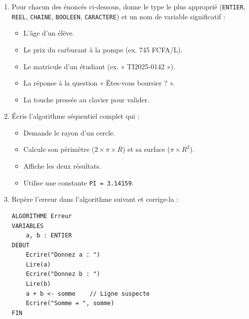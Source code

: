 \documentclass[11pt]{article}
\begin{document}
\begin{exercice}
\begin{enumerate}
    \item Pour chacun des énoncés ci-dessous, donne le type le plus approprié (\texttt{ENTIER}, \texttt{REEL}, \texttt{CHAINE}, \texttt{BOOLEEN}, \texttt{CARACTERE}) et un nom de variable significatif :
    \begin{itemize}
        \item L'âge d'un élève.
        \item Le prix du carburant à la pompe (ex. 745 FCFA/L).
        \item Le matricule d'un étudiant (ex. « TI2025-0142 »).
        \item La réponse à la question « Êtes-vous boursier ? ».
        \item La touche pressée au clavier pour valider.
    \end{itemize}
    \item Écris l'algorithme séquentiel complet qui :
    \begin{itemize}
        \item Demande le rayon d'un cercle.
        \item Calcule son périmètre ($2 \times \pi \times R$) et sa surface ($\pi \times R^2$).
        \item Affiche les deux résultats.
        \item Utilise une constante \texttt{PI = 3.14159}.
    \end{itemize}
    \item Repère l'erreur dans l'algorithme suivant et corrige-la :
\begin{lstlisting}
ALGORITHME Erreur
VARIABLES
    a, b : ENTIER
DEBUT
    Ecrire("Donnez a : ")
    Lire(a)
    Ecrire("Donnez b : ")
    Lire(b)
    a + b <- somme    // Ligne suspecte
    Ecrire("Somme = ", somme)
FIN
\end{lstlisting}
\end{enumerate}
\end{exercice}
\end{document}

